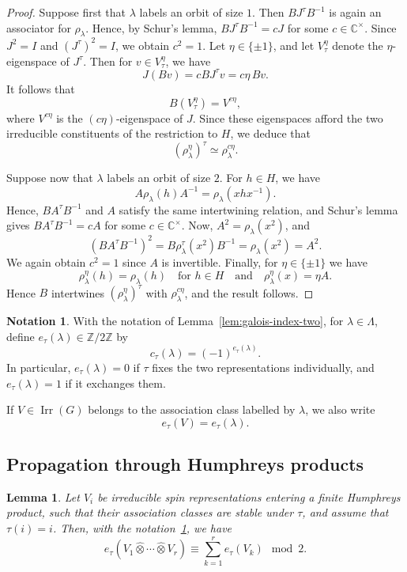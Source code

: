 \documentclass[reqno]{amsart}
\DeclareMathOperator{\Irr}{Irr}
\newtheorem{lemma}[theorem]{Lemma}     %
\theoremstyle{definition}
\newtheorem{notation}[theorem]{Notation}
\begin{document}
\begin{proof}
Suppose first that $\lambda$ labels an orbit of size $1$. Then
$BJ^\tau B^{-1}$ is again an associator for $\rho_\lambda$. Hence, by
Schur's lemma,
$
BJ^\tau B^{-1}=cJ
$
for some $c\in\mathbb C^\times$. Since $J^2=I$ and $(J^\tau)^2=I$, we
obtain $c^2=1$.
Let $\eta\in\{\pm1\}$, and let $V_\tau^\eta$ denote the $\eta$-eigenspace
of $J^\tau$. Then for $v\in V_\tau^\eta$, we have
\[
J(Bv)
=
cBJ^\tau v
=
c\eta\,Bv.
\]
It follows that
\[
B(V_\tau^\eta)=V^{c\eta},
\]
where $V^{c\eta}$ is the $(c\eta)$-eigenspace of $J$. Since these
eigenspaces afford the two irreducible constituents of the restriction
to $H$, we deduce that
\[
(\rho_\lambda^\eta)^\tau
\simeq
\rho_\lambda^{c\eta}.
\]

Suppose now that $\lambda$ labels an orbit of size $2$. 
For $h\in H$, we have
\[
A\rho_\lambda(h)A^{-1}
=
\rho_\lambda(xhx^{-1}).
\]
Hence, $BA^\tau B^{-1}$ and $A$ satisfy the same intertwining relation,
and Schur's lemma gives
$
BA^\tau B^{-1}=cA
$
for some $c\in\mathbb C^\times$. Now,
$
A^2=\rho_\lambda(x^2)$, 
and 
\[
(BA^\tau B^{-1})^2
=
B\rho_\lambda^\tau(x^2)B^{-1}
=
\rho_\lambda(x^2)
=
A^2.
\]
We again obtain $c^2=1$ since $A$ is invertible.
Finally, for $\eta\in\{\pm1\}$ we have
\[
\rho_\lambda^\eta(h)=\rho_\lambda(h)
\quad\text{for }h\in H\quad\text{and}\quad
\rho_\lambda^\eta(x)=\eta A.
\]
Hence $B$ intertwines
$(\rho_\lambda^\eta)^\tau$ with $\rho_\lambda^{c\eta}$, and the result
follows.
\end{proof}

\begin{notation}
\label{def:galois-bit}
With the notation of Lemma~\ref{lem:galois-index-two}, for
$\lambda\in\Lambda$, define $ e_\tau(\lambda)\in\mathbb Z/2\mathbb Z $ by
\[
c_\tau(\lambda)=(-1)^{e_\tau(\lambda)}.
\]
In particular, $e_\tau(\lambda)=0$ if $\tau$ fixes the two representations
individually, and $e_\tau(\lambda)=1$ if it exchanges them.

If $V\in\Irr(G)$ belongs to the association class labelled by
$\lambda$, we also write
\[
e_\tau(V)=e_\tau(\lambda).
\]
\end{notation}

\subsection{Propagation through Humphreys products}

\begin{lemma}
\label{lem:BN-propagation}
Let $V_i$ be irreducible spin representations entering a finite Humphreys
product, such that their association classes are stable under $\tau$, and
assume that $\tau(i)=i$. Then, with the notation~\ref{def:galois-bit}, we
have
\[
e_\tau(V_1\widehat\otimes\cdots\widehat\otimes V_r)
\equiv
\sum_{k=1}^r e_\tau(V_k)
\mod2.
\]
\end{lemma}
\end{document}
